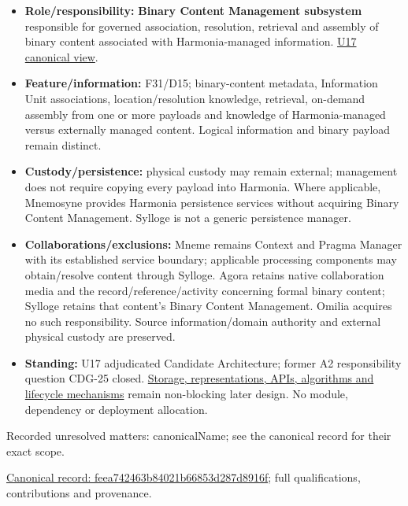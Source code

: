 \begin{itemize}


\item \textbf{Role/responsibility:} \textbf{Binary Content Management subsystem} responsible
  for governed association, resolution, retrieval and assembly of binary content
  associated with Harmonia-managed information. \hyperref[element:feea742463b84021b66853d287d8916f]{U17 canonical view}.

\item \textbf{Feature/information:} F31/D15; binary-content metadata, Information Unit
  associations, location/resolution knowledge, retrieval, on-demand assembly from
  one or more payloads and knowledge of Harmonia-managed versus externally
  managed content. Logical information and binary payload remain distinct.

\item \textbf{Custody/persistence:} physical custody may remain external; management does
  not require copying every payload into Harmonia. Where applicable, Mnemosyne
  provides Harmonia persistence services without acquiring Binary Content
  Management. Sylloge is not a generic persistence manager.

\item \textbf{Collaborations/exclusions:} Mneme remains Context and Pragma Manager with its
  established service boundary; applicable processing components may obtain/resolve
  content through Sylloge. Agora retains native collaboration media and the
  record/reference/activity concerning formal binary content; Sylloge retains
  that content's Binary Content Management. Omilia acquires no such responsibility.
  Source information/domain authority and external physical custody are preserved.

\item \textbf{Standing:} U17 adjudicated Candidate Architecture; former A2 responsibility
  question CDG-25 closed. \hyperref[element:feea742463b84021b66853d287d8916f]{Storage, representations, APIs, algorithms and lifecycle
  mechanisms} remain
  non-blocking later design. No module, dependency or deployment allocation.

\end{itemize}

{\small Recorded unresolved matters: canonicalName; see the canonical record for their exact scope.}\par
{\footnotesize \href{../../../../continuum/application/application-component/feea742463b84021b66853d287d8916f.md}{Canonical record: feea742463b84021b66853d287d8916f}; full qualifications, contributions and provenance.}\par
